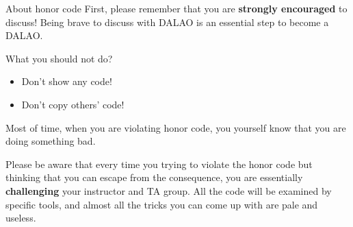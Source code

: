 \begin{frame}{About honor code}
First, please remember that you are \textbf{strongly encouraged} to discuss! Being brave to discuss with DALAO is an essential step to become a DALAO.

\begin{block}{What you should not do?}
\begin{itemize}
    \item Don't show any code! 
    \item Don't copy others' code! 
\end{itemize}
\end{block}
Most of time, when you are violating honor code, you yourself know that you are doing something bad. 

Please be aware that every time you trying to violate the honor code but thinking that you can escape from the consequence, you are essentially \textbf{challenging} your instructor and TA group. All the code will be examined by specific tools, and almost all the tricks you can come up with are pale and useless. 
\end{frame}